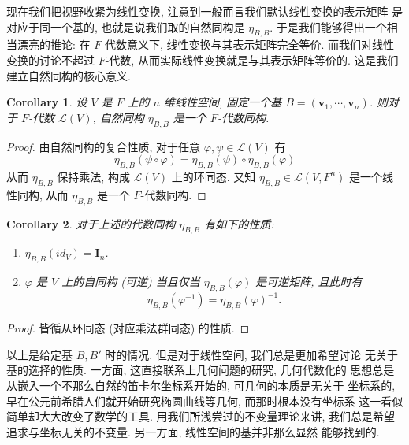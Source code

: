 \documentclass[UTF8]{book}
\newtheorem{corollary}{Corollary}[section]
\begin{document}
现在我们把视野收紧为线性变换, 注意到一般而言我们默认线性变换的表示矩阵
是对应于同一个基的, 也就是说我们取的自然同构是 $\eta_{B,B}$. 
于是我们能够得出一个相当漂亮的推论: 在 $F$-代数意义下, 
线性变换与其表示矩阵完全等价. 而我们对线性变换的讨论不超过 $F$-代数, 
从而实际线性变换就是与其表示矩阵等价的. 这是我们建立自然同构的核心意义. 

\begin{corollary}
    设 $V$ 是 $F$ 上的 $n$ 维线性空间, 
    固定一个基 
    $B=(\boldsymbol{v}_1,\cdots,\boldsymbol{v}_n)$. 
    则对于 $F$-代数 $\mathcal{L}(V)$, 
    自然同构 $\eta_{B,B}$ 是一个 $F$-代数同构. 
\end{corollary}

\begin{proof}
    由自然同构的复合性质, 对于任意 $\varphi, \psi \in \mathcal{L}(V)$ 
    有 
    $$\eta_{B,B}(\psi \circ \varphi) = 
    \eta_{B,B}(\psi) \circ \eta_{B,B}(\varphi)$$ 
    从而 $\eta_{B,B}$ 保持乘法, 构成 $\mathcal{L}(V)$ 上的环同态. 
    又知 $\eta_{B,B} \in \mathcal{L}(V,F^n)$ 是一个线性同构, 
    从而 $\eta_{B,B}$ 是一个 $F$-代数同构. 
\end{proof}

\begin{corollary}
    对于上述的代数同构 $\eta_{B,B}$ 有如下的性质: 
    \begin{enumerate}[(1)]
        \item $\eta_{B,B}(id_V) = \boldsymbol{I}_n$. 
        \item $\varphi$ 是 $V$ 上的自同构 (可逆) 当且仅当 
        $\eta_{B,B}(\varphi)$ 是可逆矩阵, 且此时有 
        $$ \eta_{B,B}(\varphi^{-1}) = \eta_{B,B}(\varphi)^{-1}.$$
    \end{enumerate}
\end{corollary}

\begin{proof}
    皆循从环同态 (对应乘法群同态) 的性质. 
\end{proof}

以上是给定基 $B,B'$ 时的情况. 但是对于线性空间, 我们总是更加希望讨论
无关于基的选择的性质. 一方面, 这直接联系上几何问题的研究, 几何代数化的
思想总是从嵌入一个不那么自然的笛卡尔坐标系开始的, 可几何的本质是无关于
坐标系的, 早在公元前希腊人们就开始研究椭圆曲线等几何, 而那时根本没有坐标系
这一看似简单却大大改变了数学的工具. 用我们所浅尝过的不变量理论来讲, 
我们总是希望追求与坐标无关的不变量. 另一方面, 线性空间的基并非那么显然
能够找到的. 
\end{document}
